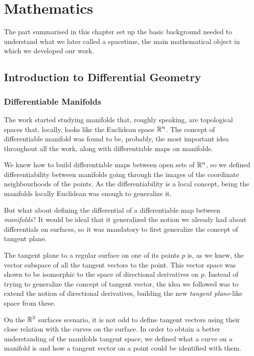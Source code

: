 \chapter{Mathematics}
\label{chapter:mathematicss}

The part summarised in this chapter set up the basic background needed to understand what we later called a spacetime, the main mathematical object in which we developed our work.

\section{Introduction to Differential Geometry}
\label{chapter:diffgeom}

\subsection{Differentiable Manifolds}

The work started studying manifolds that, roughly speaking, are topological spaces that, locally, looks like the Euclidean space $\mathbb{R}^n$.	The concept of differentiable manifold was found to be, probably, the most important idea throughout all the work, along with differentiable maps on manifolds.

We knew how to build differentiable maps between open sets of $\mathbb{R}^n$, so we defined differentiability between manifolds going through the images of the coordinate neighbourhoods of the points. As the differentiability is a local concept, being the manifolds locally Euclidean was enough to generalize it.

But what about defining the differential of a differentiable map between \emph{manifolds}? It would be ideal that it generalized the notion we already had about differentials on surfaces, so it was mandatory to first generalize the concept of tangent plane.

The tangent plane to a regular surface on one of its points $p$ is, as we knew, the vector subspace of all the tangent vectors to the point. This vector space was shown to be isomorphic to the space of directional derivatives on $p$. Instead of trying to generalize the concept of tangent vector, the idea we followed was to extend the notion of directional derivatives, building the new \emph{tangent plane}-like space from these.

On the $\mathbb{R}^3$ surfaces scenario, it is not odd to define tangent vectors using their close relation with the curves on the surface. In order to obtain a better understanding of the manifolds tangent space, we defined what a curve on a manifold is and how a tangent vector on a point could be identified with them.


